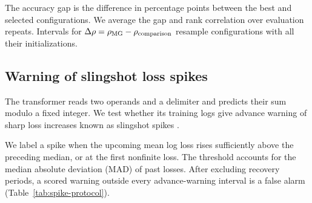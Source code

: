 {The accuracy gap is the difference in percentage points between the best and selected configurations. We average the gap and rank correlation over evaluation repeats. Intervals for $\Delta\rho=\rho_{\rm MG}-\rho_{\rm comparison}$ resample configurations with all their initializations.

\begin{table}[!htbp]
\centering\small
\caption{Rank correlation and accuracy gaps for representation selection.}
\label{tab:ssl_campaign}

\end{table}

\subsection{Warning of slingshot loss spikes}
The transformer reads two operands and a delimiter and predicts their sum modulo a fixed integer. We test whether its training logs give advance warning of sharp loss increases known as slingshot spikes \citep{thilak2022slingshot}.

We label a spike when the upcoming mean log loss rises sufficiently above the preceding median, or at the first nonfinite loss. The threshold accounts for the median absolute deviation (MAD) of past losses. After excluding recovery periods, a scored warning outside every advance-warning interval is a false alarm (Table~\ref{tab:spike-protocol}).

}
